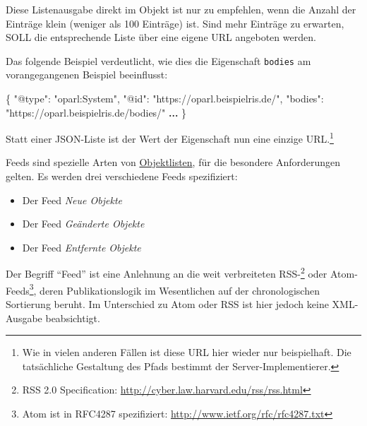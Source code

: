 \documentclass[,a4paper]{article}
\newenvironment{Shaded}{}{}
\newcommand{\DataTypeTok}[1]{\textcolor[rgb]{0.56,0.13,0.00}{{#1}}}
\newcommand{\StringTok}[1]{\textcolor[rgb]{0.25,0.44,0.63}{{#1}}}
\newcommand{\FunctionTok}[1]{\textcolor[rgb]{0.02,0.16,0.49}{{#1}}}
\newcommand{\ErrorTok}[1]{\textcolor[rgb]{1.00,0.00,0.00}{\textbf{{#1}}}}
\begin{document}
Diese Listenausgabe direkt im Objekt ist nur zu empfehlen, wenn die
Anzahl der Einträge klein (weniger als 100 Einträge) ist. Sind mehr
Einträge zu erwarten, SOLL die entsprechende Liste über eine eigene URL
angeboten werden.

Das folgende Beispiel verdeutlicht, wie dies die Eigenschaft
\texttt{bodies} am vorangegangenen Beispiel beeinflusst:

\begin{Shaded}
\begin{Highlighting}[]
\FunctionTok{\{}
    \DataTypeTok{"@type"}\FunctionTok{:} \StringTok{"oparl:System"}\FunctionTok{,}
    \DataTypeTok{"@id"}\FunctionTok{:} \StringTok{"https://oparl.beispielris.de/"}\FunctionTok{,}
    \DataTypeTok{"bodies"}\FunctionTok{:} \StringTok{"https://oparl.beispielris.de/bodies/"}
    \ErrorTok{...}
\FunctionTok{\}}
\end{Highlighting}
\end{Shaded}

Statt einer JSON-Liste ist der Wert der Eigenschaft nun eine einzige
URL.\footnote{Wie in vielen anderen Fällen ist diese URL hier wieder nur
  beispielhaft. Die tatsächliche Gestaltung des Pfads bestimmt der
  Server-Implementierer.}


Feeds sind spezielle Arten von \hyperref[objektlisten]{Objektlisten},
für die besondere Anforderungen gelten. Es werden drei verschiedene
Feeds spezifiziert:

\begin{itemize}
\itemsep1pt\parskip0pt
\item
  Der Feed \emph{Neue Objekte}
\item
  Der Feed \emph{Geänderte Objekte}
\item
  Der Feed \emph{Entfernte Objekte}
\end{itemize}

Der Begriff ``Feed'' ist eine Anlehnung an die weit verbreiteten
RSS-\footnote{RSS 2.0 Specification:
  \url{http://cyber.law.harvard.edu/rss/rss.html}} oder
Atom-Feeds\footnote{Atom ist in RFC4287 spezifiziert:
  \url{http://www.ietf.org/rfc/rfc4287.txt}}, deren Publikationslogik im
Wesentlichen auf der chronologischen Sortierung beruht. Im Unterschied
zu Atom oder RSS ist hier jedoch keine XML-Ausgabe beabsichtigt.
\end{document}
